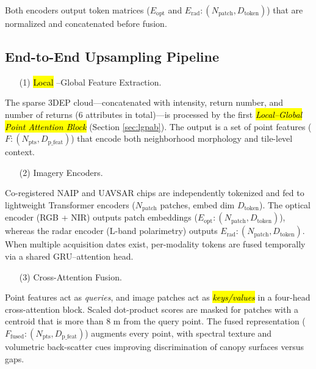 \documentclass[remotesensing,article,accept,pdftex,moreauthors]{Definitions/mdpi}
\begin{document}
Both encoders output token matrices ($E_{\text{opt}}$ and $E_{\text{rad}}: (N_{\text{patch}}, D_{\text{token}})$) that are normalized and concatenated before fusion.

\newpage

\subsection{End-to-End Upsampling Pipeline}
\label{sec:pipeline}


\begin{enumerate}
\item[(1)] {\hl{Local}%
–Global Feature Extraction.}
\end{enumerate}

The sparse 3DEP cloud—concatenated with intensity, return number, and number of returns (6 attributes in total)—is processed by the first \emph{\hl{Local–Global Point Attention Block}} (Section \ref{sec:lgpab}). The output is a set of point features ($F: (N_{\text{pts}}, D_{\text{p\_feat}})$) that encode both neighborhood morphology and tile-level context.


\begin{enumerate}
\item[(2)] {Imagery Encoders.}
\end{enumerate}

Co-registered NAIP and UAVSAR chips are independently tokenized and fed to lightweight Transformer encoders ($N_{\text{patch}}$ patches, embed dim $D_{\text{token}}$). The optical encoder (RGB + NIR) outputs patch embeddings ($E_{\text{opt}}: (N_{\text{patch}}, D_{\text{token}})$), whereas the radar encoder (L-band polarimetry) outputs $E_{\text{rad}}: (N_{\text{patch}}, D_{\text{token}})$. When multiple acquisition dates exist, per-modality tokens are fused temporally via a shared GRU–attention head.

\begin{enumerate}
\item[(3)] {Cross-Attention Fusion.}
\end{enumerate}

Point features act as \emph{queries}, and image patches act as \emph{\hl{keys/values}} %
in a four-head cross-attention block.
Scaled dot-product scores are masked for patches with a centroid that is more than 8 m from the query point. The fused representation ($F_{\text{fused}}: (N_{\text{pts}}, D_{\text{p\_feat}})$) augments every point, with spectral texture and volumetric back-scatter cues improving discrimination of canopy surfaces versus gaps.
\end{document}
